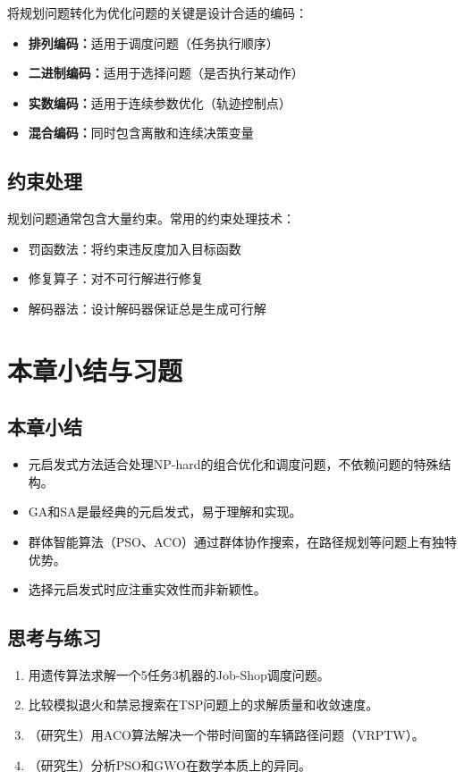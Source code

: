 将规划问题转化为优化问题的关键是设计合适的编码：
\begin{itemize}
  \item \textbf{排列编码：}适用于调度问题（任务执行顺序）
  \item \textbf{二进制编码：}适用于选择问题（是否执行某动作）
  \item \textbf{实数编码：}适用于连续参数优化（轨迹控制点）
  \item \textbf{混合编码：}同时包含离散和连续决策变量
\end{itemize}

\subsection{约束处理}

规划问题通常包含大量约束。常用的约束处理技术：
\begin{itemize}
  \item 罚函数法：将约束违反度加入目标函数
  \item 修复算子：对不可行解进行修复
  \item 解码器法：设计解码器保证总是生成可行解
\end{itemize}

\section{本章小结与习题}

\subsection*{本章小结}
\begin{itemize}
  \item 元启发式方法适合处理NP-hard的组合优化和调度问题，不依赖问题的特殊结构。
  \item GA和SA是最经典的元启发式，易于理解和实现。
  \item 群体智能算法（PSO、ACO）通过群体协作搜索，在路径规划等问题上有独特优势。
  \item 选择元启发式时应注重实效性而非新颖性。
\end{itemize}

\subsection*{思考与练习}
\begin{enumerate}
  \item 用遗传算法求解一个5任务3机器的Job-Shop调度问题。
  \item 比较模拟退火和禁忌搜索在TSP问题上的求解质量和收敛速度。
  \item （研究生）用ACO算法解决一个带时间窗的车辆路径问题（VRPTW）。
  \item （研究生）分析PSO和GWO在数学本质上的异同。
\end{enumerate}
